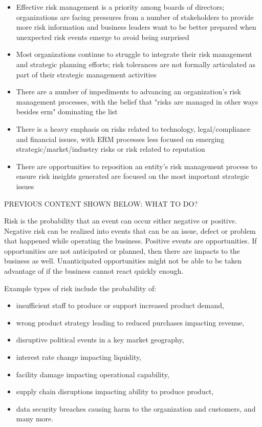 \begin{itemize}
    \item Effective risk management is a priority among boards of directors;
            organizations are facing pressures from a number of stakeholders to provide more risk information and
            business leaders want to be better prepared when unexpected risk events emerge to avoid being surprised
    \item Most organizations continue to struggle to integrate their risk management and strategic planning efforts;
            risk tolerances are not formally articulated as part of their strategic management activities
    \item There are a number of impediments to advancing an organization’s risk management processes,
            with the belief that "risks are managed in other ways besides \gls{erm}" dominating the list
    \item There is a heavy emphasis on risks related to technology, legal/compliance and financial issues,
            with ERM processes less focused on emerging strategic/market/industry risks or risk related to reputation
    \item There are opportunities to reposition an entity's risk management process to ensure risk insights
            generated are focused on the most important strategic issues
\end{itemize}



PREVIOUS CONTENT SHOWN BELOW: WHAT TO DO?

Risk is the probability that an event can occur either negative or positive.
Negative risk can be realized into events that can be an issue,
defect or problem that happened while operating the business.
Positive events are opportunities.
If opportunities are not anticipated or planned, then there are impacts to the business as well.
Unanticipated opportunities might not be able to be taken advantage of if the business cannot react quickly enough.

Example types of risk include the probability of:
\begin{itemize}
    \item insufficient staff to produce or support increased product demand,
    \item wrong product strategy leading to reduced purchases impacting revenue,
    \item disruptive political events in a key market geography,
    \item interest rate change impacting liquidity,
    \item facility damage impacting operational capability,
    \item supply chain disruptions impacting ability to produce product,
    \item data security breaches causing harm to the organization and customers, and many more.
\end{itemize}

